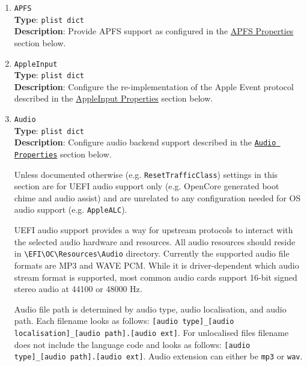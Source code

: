 \documentclass[]{article}
\begin{document}
\begin{enumerate}
\item
  \texttt{APFS}\\
  \textbf{Type}: \texttt{plist\ dict}\\
  \textbf{Description}: Provide APFS support as configured in the
  \hyperref[uefiapfsprops]{APFS Properties} section below.

\item
  \texttt{AppleInput}\\
  \textbf{Type}: \texttt{plist\ dict}\\
  \textbf{Description}: Configure the re-implementation of the Apple Event protocol
  described in the \hyperref[uefiappleinputprops]{AppleInput Properties} section below.

\item
  \texttt{Audio}\\
  \textbf{Type}: \texttt{plist\ dict}\\
  \textbf{Description}: Configure audio backend support described
  in the \hyperref[uefiaudioprops]{\texttt{Audio Properties}} section below.

  Unless documented otherwise (e.g. \texttt{ResetTrafficClass}) settings in this section
  are for UEFI audio support only (e.g. OpenCore generated boot chime and audio assist) and are
  unrelated to any configuration needed for OS audio support (e.g. \texttt{AppleALC}).

  UEFI audio support provides a way for upstream protocols to interact with the
  selected audio hardware and resources. All audio resources should reside
  in \texttt{\textbackslash EFI\textbackslash OC\textbackslash Resources\textbackslash Audio}
  directory. Currently the supported audio file formats are MP3 and WAVE PCM. While it is
  driver-dependent which audio stream format is supported, most common audio cards
  support 16-bit signed stereo audio at 44100 or 48000 Hz.

  Audio file path is determined by audio type, audio localisation, and audio path. Each filename
  looks as follows: \texttt{[audio type]\_[audio localisation]\_[audio path].[audio ext]}.
  For unlocalised files filename does not include the language code and looks as follows:
  \texttt{[audio type]\_[audio path].[audio ext]}. Audio extension can either be \texttt{mp3}
  or \texttt{wav}.


\end{enumerate}
\end{document}
